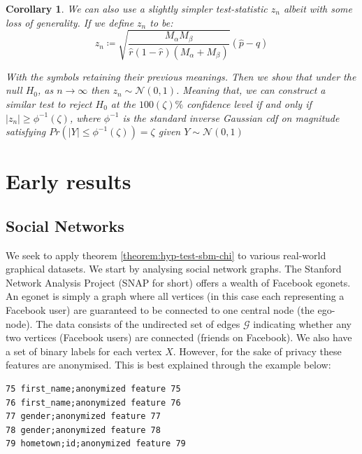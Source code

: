 \documentclass[]{article}
\newcommand{\Gaussian}{\mathcal{N}}
\newcommand{\Gcal}{\mathcal{G}}
\newtheorem{corollary}{Corollary}[theorem]
\begin{document}
\begin{corollary}
	We can also use a slightly simpler test-statistic $z_n$ albeit with some loss of generality. If we define $z_n$ to be:
	\begin{equation*}
		z_n \coloneqq \sqrt{\frac{M_\alpha M_\beta}{\hat{r}(1-\hat{r})(M_\alpha + M_\beta)}} \left( \hat{p} - \hat{q} \right)
	\end{equation*}
	
	With the symbols retaining their previous meanings. Then we show that under the null $H_0$, as $n \rightarrow \infty$ then $z_n \sim \Gaussian(0, 1)$. Meaning that, we can construct a similar test to reject $H_0$ at the $100(\zeta)\%$ confidence level if and only if $|z_n| \geq \phi^{-1}(\zeta)$, where $\phi^{-1}$ is the standard inverse Gaussian cdf on magnitude satisfying $Pr(|Y| \leq \phi^{-1}(\zeta)) = \zeta$ given $Y \sim \Gaussian(0, 1)$
\end{corollary}

\section{Early results}
\subsection{Social Networks}

We seek to apply theorem \ref{theorem:hyp-test-sbm-chi} to various real-world graphical datasets. We start by analysing social network graphs. The Stanford Network Analysis Project (SNAP for short) \cite{snapnets} offers a wealth of Facebook egonets. An egonet is simply a graph where all vertices (in this case each representing a Facebook user) are guaranteed to be connected to one central node (the ego-node). The data consists of the undirected set of edges $\Gcal$ indicating whether any two vertices (Facebook users) are connected (friends on Facebook). We also have a set of binary labels for each vertex $X$. However, for the sake of privacy these features are anonymised. This is best explained through the example below: \\

\begin{center}
\begin{minipage}{8cm}
\begin{Verbatim}[fontsize=\small, frame=single, label={\fbox{Example anonymised feature flags}}]
75 first_name;anonymized feature 75
76 first_name;anonymized feature 76
77 gender;anonymized feature 77
78 gender;anonymized feature 78
79 hometown;id;anonymized feature 79
\end{Verbatim}
\end{minipage}
\end{center}
\end{document}
